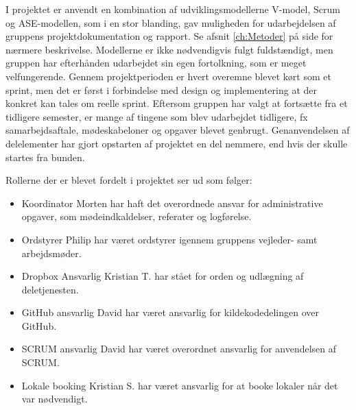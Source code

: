 I projektet er anvendt en kombination af udviklingsmodellerne V-model, Scrum og ASE-modellen, som i en stor blanding, gav muligheden for udarbejdelsen af gruppens projektdokumentation og rapport. Se afsnit \ref{ch:Metoder}  på side \pageref{ch:Metoder} for nærmere beskrivelse. Modellerne er ikke nødvendigvis fulgt fuldstændigt, men gruppen har efterhånden udarbejdet sin egen fortolkning, som er meget velfungerende. Gennem projektperioden er hvert overemne blevet kørt som et sprint, men det er  først i forbindelse med design og implementering at der konkret kan tales om reelle sprint. 
Eftersom gruppen har valgt at fortsætte fra et tidligere semester, er mange af tingene som blev udarbejdet tidligere, fx samarbejdsaftale, mødeskabeloner og opgaver blevet genbrugt. Genanvendelsen af delelementer har gjort opstarten af projektet en del nemmere, end hvis der skulle startes fra bunden.

Rollerne der er blevet fordelt i projektet ser ud som følger:

\begin{itemize}
	\item Koordinator \newline
		Morten har haft det overordnede ansvar for administrative opgaver, som mødeindkaldelser, referater og 			logførelse.
	\item Ordstyrer \newline
		Philip har været ordstyrer igennem gruppens vejleder- samt arbejdsmøder.
	\item Dropbox Ansvarlig \newline
		Kristian T. har stået for orden og udlægning af deletjenesten.
	\item GitHub ansvarlig \newline
		David har været ansvarlig for kildekodedelingen over GitHub.
	\item SCRUM ansvarlig \newline
		David har været overordnet ansvarlig for anvendelsen af SCRUM.
	\item Lokale booking \newline
		Kristian S. har været ansvarlig for at booke lokaler når det var nødvendigt.
\end{itemize}

\clearpage